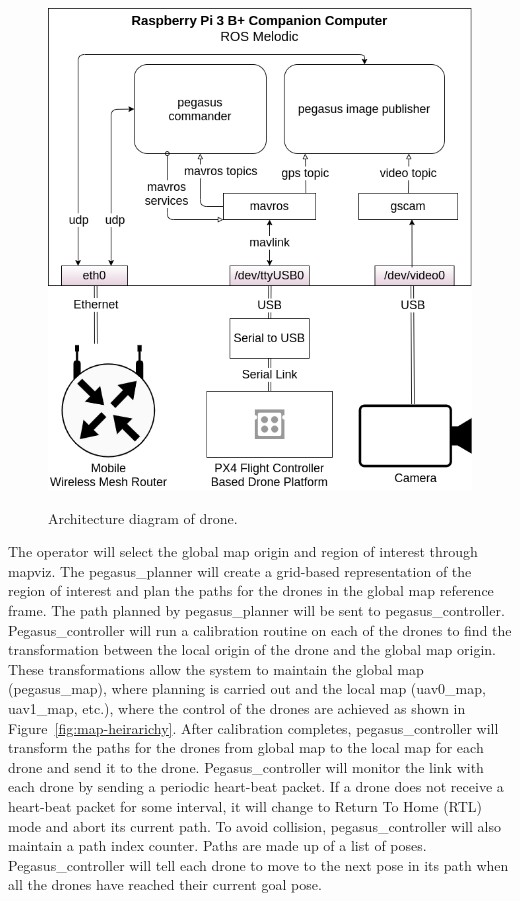 \begin{figure}
	\centering
	\caption[Pegasus GCS system overview]{\small Architecture diagram of drone.}
	\includegraphics[width=5in]{figures/methodology/methodology-drone-components}
	\label{fig:drone-components}
\end{figure}


The operator will select the global map origin and region of interest through mapviz. The pegasus\_planner will create a grid-based representation of the region of interest and plan the paths for the drones in the global map reference frame.  The path planned by pegasus\_planner will be sent to pegasus\_controller. Pegasus\_controller will run a calibration routine on each of the drones to find the transformation between the local origin of the drone and the global map origin. These transformations allow the system to maintain the global map (pegasus\_map), where planning is carried out and the local map (uav0\_map, uav1\_map, etc.), where the control of the drones are achieved as shown in Figure~\ref{fig:map-heirarichy}. After calibration completes, pegasus\_controller will transform the paths for the drones from global map to the local map for each drone and send it to the drone. Pegasus\_controller will monitor the link with each drone by sending a periodic heart-beat packet. If a drone does not receive a heart-beat packet for some interval, it will change to Return To Home (RTL) mode and abort its current path. To avoid collision, pegasus\_controller will also maintain a path index counter. Paths are made up of a list of poses. Pegasus\_controller will tell each drone to move to the next pose in its path when all the drones have reached their current goal pose.

